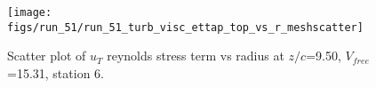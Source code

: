 \begin{figure}[H]
\centering
\texttt{[image: figs/run\_51/run\_51\_turb\_visc\_ettap\_top\_vs\_r\_meshscatter]}
\caption{Scatter plot of $
u_T$ reynolds stress term vs radius at $z/c$=9.50, $V_{free}$=15.31, station 6.}
\end{figure}


